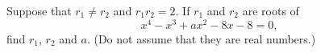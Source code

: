 Suppose that $r_1 \ne r_2$ and $r_1 r_2 = 2$. If $r_1$ and $r_2$ are roots of
$$ x^4 - x^3 + ax^2 - 8x - 8 = 0, $$
find $r_1$, $r_2$ and $a$. (Do not assume that they are real numbers.)
